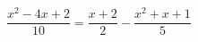 \begin{ex}
	\begin{condition}
		\( \dfrac{x^2-4x+2}{10}=\dfrac{x+2}{2}-\dfrac{x^2+x+1}{5} \)
	\end{condition}
\end{ex}